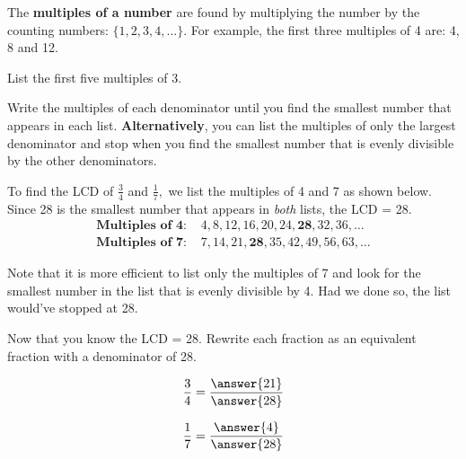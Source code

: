\documentclass{ximera}
\begin{document}
\begin{remark}
The \textbf{multiples of a number} are found by multiplying the number by the counting numbers: $\{1, 2, 3, 4, \ldots \}.$  For example, the first three multiples of 4 are:
4, 8 and 12.

\begin{problem}
List the first five multiples of $3.$ 

\begin{multipleChoice}
\end{multipleChoice} 
\end{problem}

\end{remark}


\begin{procedure}


Write the multiples  of each denominator until you find the smallest number that appears in each list.  \textbf{Alternatively}, you can list
the multiples of only the largest denominator and stop when you find the smallest number that is evenly divisible by the other denominators.
\end{procedure}


\begin{example}
To find the LCD of $\textstyle \frac{3}{4}$ and $\textstyle \frac{1}{7},$ we list the multiples of 4 and 7 as shown below.
Since 28 is the smallest number that appears in \textit{both} lists, the LCD = 28.  
\begin{align*}
\textbf{Multiples of 4: } & 4, 8, 12, 16, 20, 24, \mathbf{28}, 32, 36, \ldots \\
\textbf{Multiples of 7: } & 7, 14, 21, \mathbf{28}, 35, 42, 49, 56, 63, \ldots
\end{align*}

Note that it is more efficient to list only the multiples of 7 and look for the smallest number in the list that is 
evenly divisible by 4.  Had we done so, the list would've stopped at 28.  

\begin{problem}
Now that you know the LCD = 28.  Rewrite each fraction as an equivalent fraction with a denominator of 28.

\[ \frac{3}{4} = \frac{\answer{21}}{\answer{28}} \]

\[ \frac{1}{7} = \frac{\answer{4}}{\answer{28}} \]

\end{problem}


\end{example}
\end{document}
